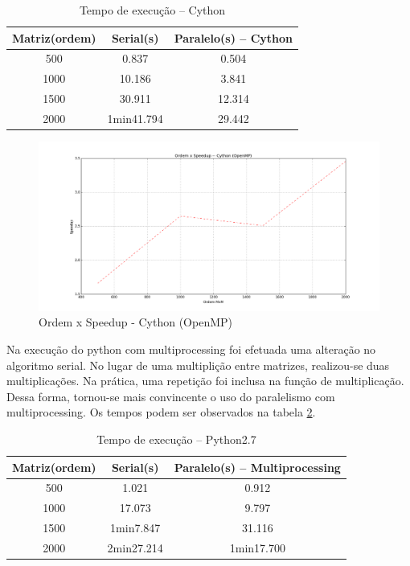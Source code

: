 \documentclass[a4paper,12pt]{article}
\begin{document}
\begin{table}
  \centering
  \caption{Tempo de execução -- Cython}
  \begin{tabular}{ccc}
    \hline
    Matriz(ordem) & Serial(s) & Paralelo(s) -- Cython \\
    \hline
    \hline
    500 & 0.837 &  0.504 \\
    1000 & 10.186 & 3.841\\
    1500 & 30.911 & 12.314\\
    2000 & 1min41.794 & 29.442\\
    \hline
  \end{tabular}
  \label{tab:timePy1}
\end{table}


\begin{figure}[!htb]  
  \centering
  \includegraphics[width=15.0cm]{pictures/speedup_Cython.png}
  \caption{Ordem x Speedup - Cython (OpenMP)}
\label{fig:speedup_Cython}
\end{figure}


Na execução do python com multiprocessing foi efetuada uma alteração no algoritmo serial. No lugar de uma multiplição entre matrizes, realizou-se duas multiplicações. Na prática, uma repetição foi inclusa na função de multiplicação. Dessa forma, tornou-se mais convincente o uso do paralelismo com multiprocessing. Os tempos podem ser observados na tabela \ref{tab:timePy2}. 

\begin{table}
  \centering
  \caption{Tempo de execução -- Python2.7}
  \begin{tabular}{ccc}
    \hline
    Matriz(ordem) & Serial(s) & Paralelo(s) -- Multiprocessing \\
    \hline
    \hline
    500 & 1.021 &  0.912 \\
    1000 & 17.073 & 9.797\\
    1500 & 1min7.847 & 31.116\\
    2000 & 2min27.214 & 1min17.700\\
    \hline
  \end{tabular}
  \label{tab:timePy2}
\end{table}
\end{document}
